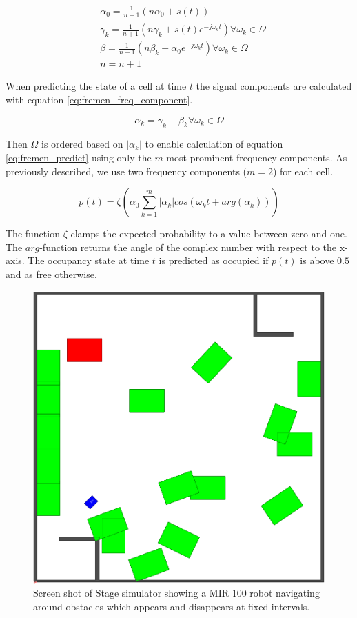 \begin{eqnarray}
&\alpha_0 = \frac{1}{n+1}(n \alpha_0 + s(t)) \nonumber \\ 
&\gamma_k = \frac{1}{n+1}(n \gamma_k + s(t) e^{-j \omega_k t}) \forall \omega_k \in \Omega  \\
&\beta = \frac{1}{n+1}(n \beta_k + \alpha_0 e^{-j \omega_k t}) \forall \omega_k \in \Omega \nonumber \\
&n = n + 1 \nonumber
\label{eq:fremen_update}
\end{eqnarray}

When predicting the state of a cell at time $t$ the signal components are calculated with equation \ref{eq:fremen_freq_component}.

\begin{equation}
    \alpha_k = \gamma_k - \beta_k \forall \omega_k \in \Omega
    \label{eq:fremen_freq_component}
\end{equation}

Then $ \Omega $ is ordered based on $ | \alpha_k | $ to enable calculation of equation \ref{eq:fremen_predict} using only the $m$ most prominent frequency components. As previously described, we use two frequency components ($ m=2 $) for each cell.

\begin{equation}
p(t) = \zeta \left( \alpha_0 \sum_{k=1}^{m} |\alpha_k| cos(\omega_k t + arg(\alpha_k))  \right)
\label{eq:fremen_predict}
\end{equation}

The function $\zeta$ clamps the expected probability to a value between zero and one. The $arg$-function returns the angle of the complex number with respect to the x-axis.
The occupancy state at time $t$ is predicted as occupied if $p(t)$ is above $0.5$ and as free otherwise.

\begin{figure}[htbp]
\centering
\includegraphics[width=0.4\linewidth]{chapters/mapping_of_dynamic_areas/figures/simulated_environment}
\caption{Screen shot of Stage simulator showing a MIR 100 robot navigating around obstacles which appears and disappears at fixed intervals.}
\label{fig:simulated_environment}
\end{figure}

